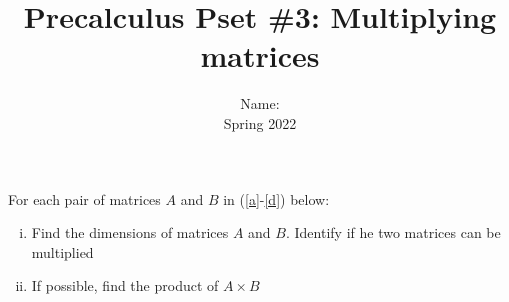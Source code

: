 \documentclass{exam}
\title{Precalculus Pset \#3:  Multiplying matrices  }
\author{  Name: \setlength\fillinlinelength{2in} \fillin \\
Spring 2022 }
\begin{document}
\maketitle
\thispagestyle{empty}

\begin{questions}
\question
For each pair of matrices $A$ and $B$ in (\ref{a}-\ref{d}) below:
\begin{enumerate}[i.]
\item Find the dimensions of matrices $A$ and $B$. Identify if he two matrices can be multiplied
\item If possible, find the  product of $A\times B$
\end{enumerate}
\vspace{0.5cm}
\end{questions}
\end{document}
